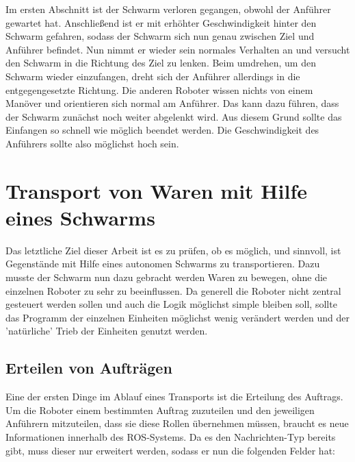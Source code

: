 Im ersten Abschnitt ist der Schwarm verloren gegangen, obwohl der Anführer gewartet hat. Anschließend ist er mit erhöhter Geschwindigkeit hinter den Schwarm gefahren, sodass der Schwarm sich nun genau zwischen Ziel und Anführer befindet. Nun nimmt er wieder sein normales Verhalten an und versucht den Schwarm in die Richtung des Ziel zu lenken. Beim umdrehen, um den Schwarm wieder einzufangen, dreht sich der Anführer allerdings in die entgegengesetzte Richtung. Die anderen Roboter wissen nichts von einem Manöver und orientieren sich normal am Anführer. Das kann dazu führen, dass der Schwarm zunächst noch weiter abgelenkt wird. Aus diesem Grund sollte das Einfangen so schnell wie möglich beendet werden. Die Geschwindigkeit des Anführers sollte also möglichst hoch sein.








\section{Transport von Waren mit Hilfe eines Schwarms}

Das letztliche Ziel dieser Arbeit ist es zu prüfen, ob es möglich, und sinnvoll, ist Gegenstände mit Hilfe eines autonomen Schwarms zu transportieren. Dazu musste der Schwarm nun dazu gebracht werden Waren zu bewegen, ohne die einzelnen Roboter zu sehr zu beeinflussen. Da generell die Roboter nicht zentral gesteuert werden sollen und auch die Logik möglichst simple bleiben soll, sollte das Programm der einzelnen Einheiten möglichst wenig verändert werden und der 'natürliche' Trieb der Einheiten genutzt werden.

\subsection*{Erteilen von Aufträgen}

Eine der ersten Dinge im Ablauf eines Transports ist die Erteilung des Auftrags. Um die Roboter einem bestimmten Auftrag zuzuteilen und den jeweiligen Anführern mitzuteilen, dass sie diese Rollen übernehmen müssen, braucht es neue Informationen innerhalb des \ac{ROS}-Systems. Da es den Nachrichten-Typ  bereits gibt, muss dieser nur erweitert werden, sodass er nun die folgenden Felder hat:


